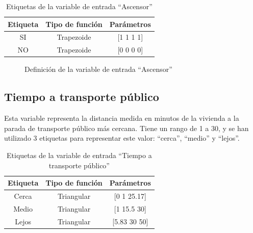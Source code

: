 \documentclass[12pt]{report} %
\begin{document}
        \begin{table}[h]
            \center
            \begin{tabular}{@{}ccc@{}}
                \toprule
                \textbf{Etiqueta} & \textbf{Tipo de función} & \textbf{Parámetros} \\
                \midrule
                SI & Trapezoide & [1 1 1 1] \\
                NO & Trapezoide & [0 0 0 0] \\
                \bottomrule
            \end{tabular}
            \caption{Etiquetas de la variable de entrada ``Ascensor''}
        \end{table}

        \begin{figure}[H]
            \centering
            \caption{Definición de la variable de entrada ``Ascensor''}
        \end{figure}

        \subsection{Tiempo a transporte público}
        Esta variable representa la distancia medida en minutos de la vivienda a la parada de transporte público más cercana.
        Tiene un rango de 1 a 30, y se han utilizado 3 etiquetas para representar este valor: ``cerca'', ``medio'' y ``lejos''.

        \begin{table}[h]
            \center
            \begin{tabular}{@{}ccc@{}}
                \toprule
                \textbf{Etiqueta} & \textbf{Tipo de función} & \textbf{Parámetros} \\
                \midrule
                Cerca & Triangular & [0 1 25.17]  \\
                Medio & Triangular & [1 15.5 30]  \\
                Lejos & Triangular & [5.83 30 50] \\
                \bottomrule
            \end{tabular}
            \caption{Etiquetas de la variable de entrada ``Tiempo a transporte público''}
        \end{table}
\end{document}
